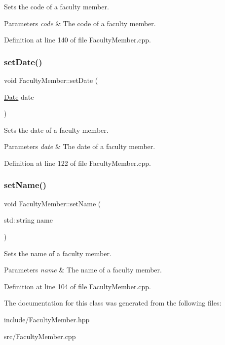 Sets the code of a faculty member. 
\begin{DoxyParams}{Parameters}
{\em code} & The code of a faculty member. \\
\hline
\end{DoxyParams}


Definition at line 140 of file Faculty\+Member.\+cpp.

\mbox{\label{classFacultyMember_abec27c8af8bd8274a3ea560da0f12cbd}} 
\subsubsection{\texorpdfstring{set\+Date()}{setDate()}}
{\footnotesize\ttfamily void Faculty\+Member\+::set\+Date (\begin{DoxyParamCaption}\item[{\hyperlink{classDate}{Date}}]{date }\end{DoxyParamCaption})}

Sets the date of a faculty member. 
\begin{DoxyParams}{Parameters}
{\em date} & The date of a faculty member. \\
\hline
\end{DoxyParams}


Definition at line 122 of file Faculty\+Member.\+cpp.

\mbox{\label{classFacultyMember_a7e4ef8e1a740e7e46d17ed9df43bc5d8}} 
\subsubsection{\texorpdfstring{set\+Name()}{setName()}}
{\footnotesize\ttfamily void Faculty\+Member\+::set\+Name (\begin{DoxyParamCaption}\item[{std\+::string}]{name }\end{DoxyParamCaption})}

Sets the name of a faculty member. 
\begin{DoxyParams}{Parameters}
{\em name} & The name of a faculty member. \\
\hline
\end{DoxyParams}


Definition at line 104 of file Faculty\+Member.\+cpp.



The documentation for this class was generated from the following files\+:\begin{DoxyCompactItemize}
\item 
include/Faculty\+Member.\+hpp\item 
src/Faculty\+Member.\+cpp\end{DoxyCompactItemize}
